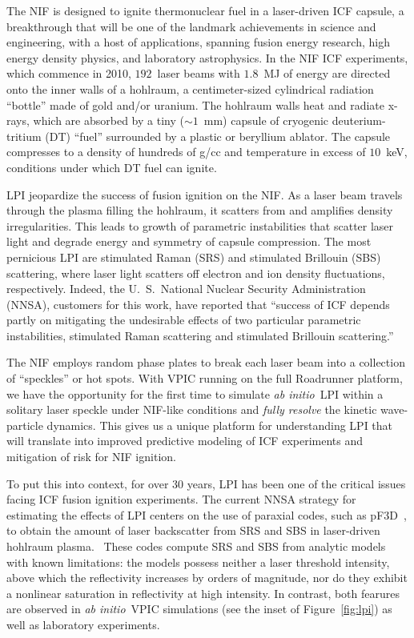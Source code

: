 \documentclass[journal,twoside]{IEEEtran}
\newcommand{\fig}[1]{Figure~\ref{fig:#1}}
\newcommand{\abinitio} {\textit{ab initio}}
\begin{document}
The NIF is designed to ignite thermonuclear fuel in a laser-driven ICF
capsule, a breakthrough that will be one of the landmark achievements
in science and engineering, with a host of applications, spanning
fusion energy research, high energy density physics, and laboratory
astrophysics.  In the NIF ICF experiments, which commence in 2010,
$192$~laser beams with $1.8$~MJ of energy are directed onto the inner
walls of a hohlraum, a centimeter-sized cylindrical radiation
``bottle'' made of gold and/or uranium.  The hohlraum walls heat and
radiate x-rays, which are absorbed by a tiny ($\sim 1$~mm) capsule of
cryogenic deuterium-tritium (DT) ``fuel'' surrounded by a plastic or
beryllium ablator.  The capsule compresses to a density of hundreds of
g/cc and temperature in excess of $10$~keV, conditions under which DT
fuel can ignite.

LPI jeopardize the success of fusion ignition on the NIF.  As a laser
beam travels through the plasma filling the hohlraum, it scatters from
and amplifies density irregularities.  This leads to growth of
parametric instabilities that scatter laser light and degrade energy
and symmetry of capsule compression.  The most pernicious LPI are
stimulated Raman (SRS) and stimulated Brillouin (SBS) scattering,
where laser light scatters off electron and ion density fluctuations,
respectively.  Indeed, the U.~S.~National Nuclear Security
Administration (NNSA), customers for this work, have reported that
``success of ICF depends partly on mitigating the undesirable effects
of two particular parametric instabilities, stimulated Raman
scattering and stimulated Brillouin
scattering.''~\cite{LLNL_LPI_webpage}

The NIF employs random phase plates to break each laser beam into a
collection of ``speckles'' or hot spots.  With VPIC running on the
full Roadrunner platform, we have the opportunity for the first time
to simulate \abinitio\ LPI within a solitary laser speckle under
NIF-like conditions and \textit{fully resolve} the kinetic
wave-particle dynamics.  This gives us a unique platform for
understanding LPI that will translate into improved predictive
modeling of ICF experiments and mitigation of risk for NIF ignition.

To put this into context, for over 30 years, LPI has been one of
the critical issues facing ICF fusion ignition experiments.  
The current NNSA strategy for estimating the effects of LPI
centers on the use of paraxial codes, 
such as pF3D~\cite{Berger_Phys_Plasmas_1998}, 
to obtain the amount of laser backscatter from SRS and 
SBS in laser-driven hohlraum plasma.~\cite{Glenzer_Nature_Physics_2007,
Labaune_Nature_Physics_2007}
These codes compute SRS and SBS from
analytic models with known limitations: the models possess neither a 
laser threshold intensity, above which the reflectivity increases by 
orders of magnitude, nor do they exhibit a nonlinear saturation in reflectivity 
at high intensity. In contrast, both fearures are observed in \abinitio\ VPIC 
simulations (see the inset of \fig{lpi}) 
as well as laboratory experiments.~\cite{Montgomery_et_al_Phys_Plasmas_2002}  
\end{document}
